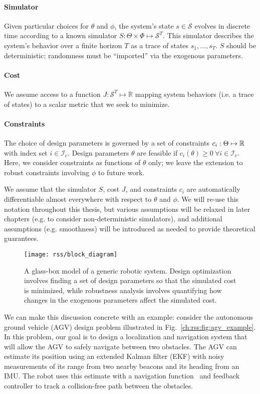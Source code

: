 \paragraph{Simulator} Given particular choices for $\theta$ and $\phi$, the system's state $s \in \mathcal{S}$ evolves in discrete time according to a known simulator $S : \Theta \times \Phi \mapsto \mathcal{S}^T$. This simulator describes the system's behavior over a finite horizon $T$ as a trace of states $s_1, \ldots, s_T$. $S$ should be deterministic; randomness must be ``imported'' via the exogenous parameters.
\paragraph{Cost} We assume access to a function $J: \mathcal{S}^T \mapsto \mathbb{R}$ mapping system behaviors (i.e. a trace of states) to a scalar metric that we seek to minimize.
\paragraph{Constraints} The choice of design parameters is governed by a set of constraints $c_i : \Theta \mapsto \mathbb{R}$ with index set $i \in \mathcal{I}_c$. Design parameters $\theta$ are feasible if $c_i(\theta) \geq 0 \ \forall i \in \mathcal{I}_c$. Here, we consider constraints as functions of $\theta$ only; we leave the extension to robust constraints involving $\phi$ to future work.

We assume that the simulator $S$, cost $J$, and constraints $c_i$ are automatically differentiable almost everywhere with respect to $\theta$ and $\phi$. We will re-use this notation throughout this thesis, but various assumptions will be relaxed in later chapters (e.g. to consider non-deterministic simulators), and additional assumptions (e.g. smoothness) will be introduced as needed to provide theoretical guarantees.

\begin{figure}[t!]
    \centering
    \texttt{[image: rss/block\_diagram]}
    \caption{A glass-box model of a generic robotic system. Design optimization involves finding a set of design parameters so that the simulated cost is minimized, while robustness analysis involves quantifying how changes in the exogenous parameters affect the simulated cost.}
    \label{ch:rss:fig:block_diagram}
\end{figure}

We can make this discussion concrete with an example: consider the autonomous ground vehicle (AGV) design problem illustrated in Fig.~\ref{ch:rss:fig:agv_example}. In this problem, our goal is to design a localization and navigation system that will allow the AGV to safely navigate between two obstacles. The AGV can estimate its position using an extended Kalman filter (EKF) with noisy measurements of its range from two nearby beacons and its heading from an IMU. The robot uses this estimate with a navigation function~\cite{aiama} and feedback controller to track a collision-free path between the obstacles.


